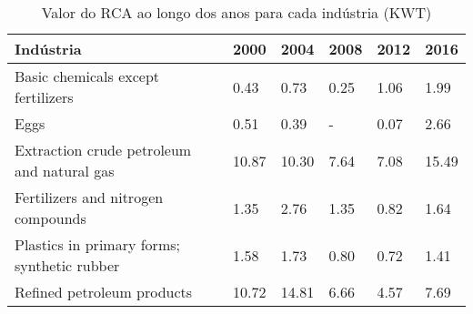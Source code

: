 \begin{table}
\centering
\caption{Valor do RCA ao longo dos anos para cada indústria (KWT)}
\label{tab:ex3-tempo-KWT}
\begin{tabular}{p{6cm}p{1.5cm}p{1.5cm}p{1.5cm}p{1.5cm}p{1.5cm}}
\toprule
                                  Indústria &  2000 &  2004 & 2008 & 2012 &  2016 \\
\midrule
         Basic chemicals except fertilizers &  0.43 &  0.73 & 0.25 & 1.06 &  1.99 \\
                                       Eggs &  0.51 &  0.39 &    - & 0.07 &  2.66 \\
 Extraction crude petroleum and natural gas & 10.87 & 10.30 & 7.64 & 7.08 & 15.49 \\
         Fertilizers and nitrogen compounds &  1.35 &  2.76 & 1.35 & 0.82 &  1.64 \\
Plastics in primary forms; synthetic rubber &  1.58 &  1.73 & 0.80 & 0.72 &  1.41 \\
                 Refined petroleum products & 10.72 & 14.81 & 6.66 & 4.57 &  7.69 \\
\bottomrule
\end{tabular}
\end{table}
